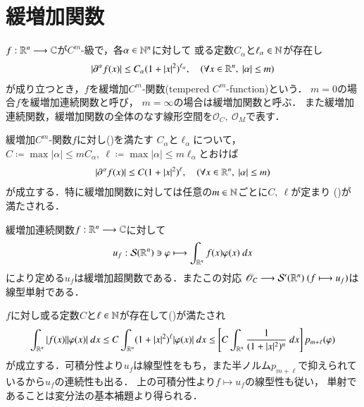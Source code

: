 \section{緩増加関数}
	\begin{screen}
		\begin{dfn}[緩増加$C^m$-関数]
			$f:\mathbb{R}^n \longrightarrow \mathbb{C}$が$C^m$-級で，各$\alpha \in \mathbb{N}^n$に対して
			或る定数$C_\alpha$と$\ell_\alpha \in \mathbb{N}$が存在し
			\begin{align}
				\left| \partial^\alpha f(x) \right| \leq C_\alpha(1+|x|^2)^{\ell_\alpha},
				\quad (\forall x \in \mathbb{R}^n,\ |\alpha| \leq m)
				\label{eq:tempered_c^m_function}
			\end{align}
			が成り立つとき，$f$を緩増加$C^m$-関数(tempered $C^m$-function)という．
			$m=0$の場合$f$を緩増加連続関数と呼び，
			$m=\infty$の場合は緩増加関数と呼ぶ．
			また緩増加連続関数，緩増加関数の全体のなす線形空間を$\mathscr{O}_C,\ \mathscr{O}_M$で表す．
		\end{dfn}
	\end{screen}
	
	緩増加$C^m$-関数$f$に対し()を満たす
	$C_\alpha$と$\ell_\alpha$について，
	$C \coloneqq \max{|\alpha| \leq m}{C_\alpha}
	,\ \ell \coloneqq \max{|\alpha| \leq m}{\ell_\alpha}$とおけば
	\begin{align}
		\left| \partial^\alpha f(x) \right| \leq C(1+|x|^2)^\ell,
		\quad (\forall x \in \mathbb{R}^n,\ |\alpha| \leq m)
		\label{eq:tempered_c^m_function_2}
	\end{align}
	が成立する．特に緩増加関数に対しては任意の$m \in \mathbb{N}$ごとに$C,\ \ell$が定まり
	()が満たされる．
	
	\begin{screen}
		\begin{thm}[緩増加連続関数により定まる緩増加超関数]
		\label{thm:tempered_continuous_functions_and_tempered_distributions}
			緩増加連続関数$f:\mathbb{R}^n \longrightarrow \mathbb{C}$に対して
			\begin{align}
				u_f: \mathcal{S}(\mathbb{R}^n) \ni \varphi \longmapsto
				\int_{\mathbb{R}^n} f(x) \varphi(x)\ dx
			\end{align}
			により定める$u_f$は緩増加超関数である．またこの対応
			$\mathscr{O}_C \longrightarrow \mathcal{S}'(\mathbb{R}^n)\ (f \longmapsto u_f)$は
			線型単射である．
		\end{thm}
	\end{screen}
	
	\begin{prf}
		$f$に対し或る定数$C$と$\ell \in \mathbb{N}$が存在して()が満たされ
		\begin{align}
			\int_{\mathbb{R}^n} |f(x)| |\varphi(x)|\ dx
			\leq C \int_{\mathbb{R}^n} (1+|x|^2)^\ell |\varphi(x)|\ dx
			\leq \left[ C \int_{\mathbb{R}^n} \frac{1}{(1+|x|^2)^n}\ dx \right] p_{m+\ell}(\varphi) 
		\end{align}
		が成立する．可積分性より$u_f$は線型性をもち，また半ノルム$p_{m+\ell}$で抑えられているから$u_f$の連続性も出る．
		上の可積分性より$f \longmapsto u_f$の線型性も従い，
		単射であることは変分法の基本補題より得られる．
		\QED
	\end{prf}